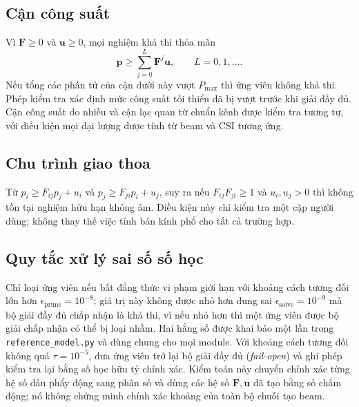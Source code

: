 \documentclass[11pt,onecolumn]{IEEEtran}
\begin{document}
\subsection{Cận công suất}
Vì $\mathbf F\geq0$ và $\mathbf u\geq0$, mọi nghiệm khả thi thỏa mãn
\begin{equation}
\mathbf p\geq\sum_{j=0}^{L}\mathbf F^j\mathbf u,\qquad L=0,1,\dots.
\label{eq:neumann}
\end{equation}
Nếu tổng các phần tử của cận dưới này vượt $P_{\max}$ thì ứng viên không khả thi. Phép kiểm tra xác định mức công suất tối thiểu đã bị vượt trước khi giải đầy đủ. Cận công suất do nhiễu và cận lạc quan từ chuẩn kênh được kiểm tra tương tự, với điều kiện mọi đại lượng được tính từ beam và CSI tương ứng.

\subsection{Chu trình giao thoa}
Từ $p_i\geq F_{ij}p_j+u_i$ và $p_j\geq F_{ji}p_i+u_j$, suy ra nếu $F_{ij}F_{ji}\geq1$ và $u_i,u_j>0$ thì không tồn tại nghiệm hữu hạn không âm. Điều kiện này chỉ kiểm tra một cặp người dùng; không thay thế việc tính bán kính phổ cho tất cả trường hợp.

\subsection{Quy tắc xử lý sai số số học}
Chỉ loại ứng viên nếu bất đẳng thức vi phạm giới hạn với khoảng cách tương đối lớn hơn $\epsilon_{\mathrm{prune}}=10^{-8}$; giá trị này không được nhỏ hơn dung sai $\epsilon_{\mathrm{solve}}=10^{-9}$ mà bộ giải đầy đủ chấp nhận là khả thi, vì nếu nhỏ hơn thì một ứng viên được bộ giải chấp nhận có thể bị loại nhầm. Hai hằng số được khai báo một lần trong \texttt{reference\_model.py} và dùng chung cho mọi module. Với khoảng cách tương đối không quá $\tau=10^{-5}$, đưa ứng viên trở lại bộ giải đầy đủ (\emph{fail-open}) và ghi phép kiểm tra lại bằng số học hữu tỷ chính xác. Kiểm toán này chuyển chính xác từng hệ số dấu phẩy động sang phân số và dùng các hệ số $\mathbf F,\mathbf u$ đã tạo bằng số chấm động; nó không chứng minh chính xác khoảng của toàn bộ chuỗi tạo beam.
\end{document}
